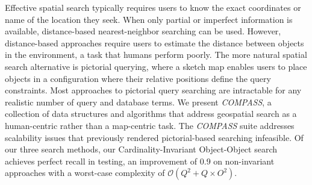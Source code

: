 

Effective spatial search typically requires users to know the exact coordinates or name of the location they seek.
When only partial or imperfect information is available, distance-based nearest-neighbor searching can be used.
However, distance-based approaches require users to estimate the distance between objects in the environment, a task that humans perform poorly.
The more natural spatial search alternative is pictorial querying, where a sketch map enables users to place objects in a configuration where their relative positions define the query constraints.
Most approaches to pictorial query searching are intractable for any realistic number of query and database terms.
We present \emph{COMPASS}, a collection of data structures and algorithms that address geospatial search as a human-centric rather than a map-centric task. 
The \emph{COMPASS} suite addresses scalability issues that previously rendered pictorial-based searching infeasible. 
Of our three search methods, our Cardinality-Invariant Object-Object search achieves perfect recall in testing, an improvement of 0.9 on non-invariant approaches with a worst-case complexity of $\mathcal{O}(Q^2 + Q\times O^2)$.






